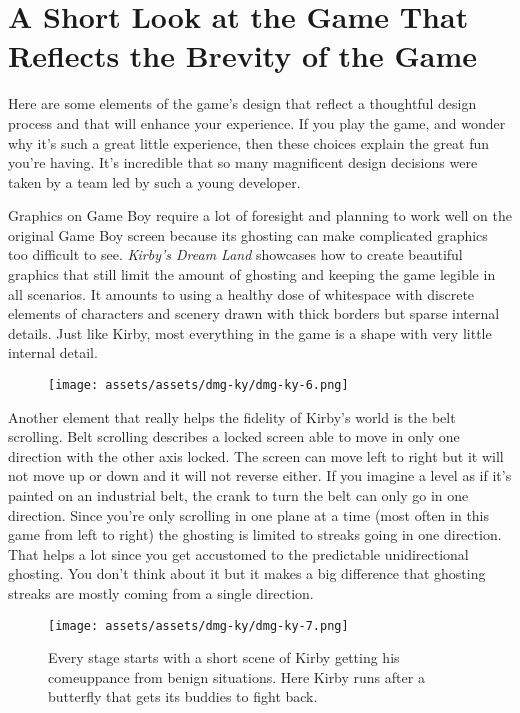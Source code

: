 \documentclass{book}
\begin{document}
\FloatBarrier\needspace{10mm}\section*{A Short Look at the Game That Reflects the Brevity of the Game}\nopagebreak[4]

Here are some elements of the game’s design that reflect a thoughtful design process and that will enhance your experience. If you play the game, and wonder why it’s such a great little experience, then these choices explain the great fun you’re having. It’s incredible that so many magnificent design decisions were taken by a team led by such a young developer.

Graphics on Game Boy require a lot of foresight and planning to work well on the original Game Boy screen because its ghosting can make complicated graphics too difficult to see. \emph{Kirby’s Dream Land} showcases how to create beautiful graphics that still limit the amount of ghosting and keeping the game legible in all scenarios. It amounts to using a healthy dose of whitespace with discrete elements of characters and scenery drawn with thick borders but sparse internal details. Just like Kirby, most everything in the game is a shape with very little internal detail.

\begin{figure}[hbt]
\vskip 10pt
\centering \texttt{[image: assets/assets/dmg-ky/dmg-ky-6.png]}
\vskip 6pt
\end{figure}

Another element that really helps the fidelity of Kirby’s world is the belt scrolling. Belt scrolling describes a locked screen able to move in only one direction with the other axis locked. The screen can move left to right but it will not move up or down and it will not reverse either. If you imagine a level as if it’s painted on an industrial belt, the crank to turn the belt can only go in one direction. Since you’re only scrolling in one plane at a time (most often in this game from left to right) the ghosting is limited to streaks going in one direction. That helps a lot since you get accustomed to the predictable unidirectional ghosting. You don’t think about it but it makes a big difference that ghosting streaks are mostly coming from a single direction.

\begin{figure}[hbt]
\vskip 10pt
\centering \texttt{[image: assets/assets/dmg-ky/dmg-ky-7.png]}\par\pagetwodescription Every stage starts with a short scene of Kirby getting his comeuppance from benign situations. Here Kirby runs after a butterfly that gets its buddies to fight back.
\vskip 6pt
\end{figure}
\end{document}

